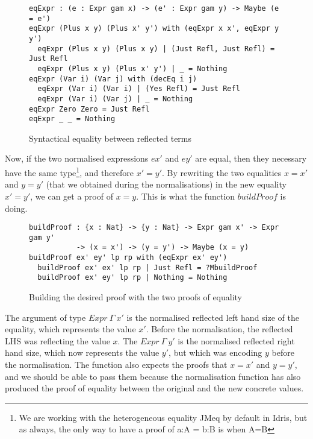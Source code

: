 \begin{figure}[H]
\figrule
\begin{center}
\begin{verbatim}
eqExpr : (e : Expr gam x) -> (e' : Expr gam y) -> Maybe (e = e')
eqExpr (Plus x y) (Plus x' y') with (eqExpr x x', eqExpr y y')
  eqExpr (Plus x y) (Plus x y) | (Just Refl, Just Refl) = Just Refl
  eqExpr (Plus x y) (Plus x' y') | _ = Nothing
eqExpr (Var i) (Var j) with (decEq i j)
  eqExpr (Var i) (Var i) | (Yes Refl) = Just Refl
  eqExpr (Var i) (Var j) | _ = Nothing
eqExpr Zero Zero = Just Refl
eqExpr _ _ = Nothing
\end{verbatim}
\end{center}
\caption{Syntactical equality between reflected terms}
\figrule
\end{figure}


Now, if the two normalised expressions $ex'$ and $ey'$ are equal, then they necessary have the same type\footnote{We are working with the heterogeneous equality JMeq by default in Idris, but as always, the only way to have a proof of a:A = b:B is when A=B}, and therefore $x'=y'$.
By rewriting the two equalities $x=x'$ and $y=y'$ (that we obtained during the normalisations) in the new equality $x'=y'$, we can get a proof of $x=y$. This is what the function $buildProof$ is doing.

\begin{figure}[H]
\figrule
\begin{center}
\begin{verbatim}
buildProof : {x : Nat} -> {y : Nat} -> Expr gam x' -> Expr gam y' 
           -> (x = x') -> (y = y') -> Maybe (x = y)
buildProof ex' ey' lp rp with (eqExpr ex' ey')
  buildProof ex' ex' lp rp | Just Refl = ?MbuildProof
  buildProof ex' ey' lp rp | Nothing = Nothing
\end{verbatim}
\end{center}
\caption{Building the desired proof with the two proofs of equality}
\figrule
\end{figure}

The argument of type $Expr\ \Gamma\ x'$ is the normalised reflected left hand size of the equality, which represents the value $x'$. Before the normalisation, the reflected LHS was reflecting the value $x$. The $Expr\ \Gamma\ y'$ is the normalised reflected right hand size, which now represents the value $y'$, but which was encoding $y$ before the normalisation. The function also expects the proofs that $x=x'$ and $y=y'$, and we should be able to pass them because the normalisation function has also produced the proof of equality between the original and the new concrete values.

